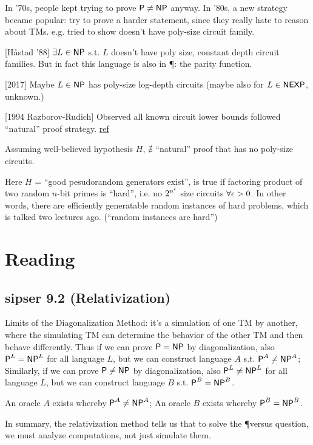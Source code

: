 \documentclass{article}
\begin{document}
In '70s, people kept trying to prove \(\text{\sf P} \neq \text{\sf NP}\) anyway.
In '80s, a new strategy became popular: try to prove a harder statement, since they really hate to reason about TMs. e.g. tried to show \NP doesn't have poly-size circuit family.

[Håstad '88] \(\exists L \in \text{\sf NP}\) s.t. \(L\) doesn't have poly size, constant depth circuit families. But in fact this language is also in \P: the parity function.

[2017] Maybe \(L \in \text{\sf NP}\) has poly-size log-depth circuits (maybe also for \(L \in \text{\sf NEXP}\), unknown.)

[1994 Razborov-Rudich] Observed all known circuit lower bounds followed ``natural'' proof strategy. \hyperlink{https://en.wikipedia.org/wiki/Natural_proof}{ref}

\begin{theorem}
  Assuming well-believed hypothesis \(H\), \(\nexists\) ``natural'' proof that \NP has no poly-size circuits.
\end{theorem}

Here \(H\) = ``good pesudorandom generators exist'', is true if factoring product of two random \(n\)-bit primes is ``hard'', i.e. no \(2^{n^\epsilon}\) size circuits \(\forall \epsilon>0\).
In other words, there are efficiently generatable random instances of hard problems, which is talked two lectures ago. (``random  instances are hard'')

\section{Reading}

\subsection{sipser 9.2 (Relativization)}

Limits of the Diagonalization Method: it's a simulation of one TM by another, where the simulating TM can determine the behavior of the other TM and then behave differently. Thus if we can prove \(\text{\sf P} = \text{\sf NP}\) by diagonalization, also \(\text{\sf P}^L = \text{\sf NP}^L\) for all language \(L\), but we can construct language \(A\) s.t. \(\text{\sf P}^A \neq \text{\sf NP}^A\); Similarly, if we can prove \(\text{\sf P} \neq \text{\sf NP}\) by diagonalization, also \(\text{\sf P}^L \neq \text{\sf NP}^L\) for all language \(L\), but we can construct language \(B\) s.t. \(\text{\sf P}^B = \text{\sf NP}^B\).

\begin{theorem}
  An oracle \(A\) exists whereby \(\text{\sf P}^A \neq \text{\sf NP}^A\);
  An oracle \(B\) exists whereby \(\text{\sf P}^B = \text{\sf NP}^B\).
\end{theorem}

In summary, the relativization method tells us that to solve the \P versus \NP question, we must analyze computations, not just simulate them.
\end{document}
